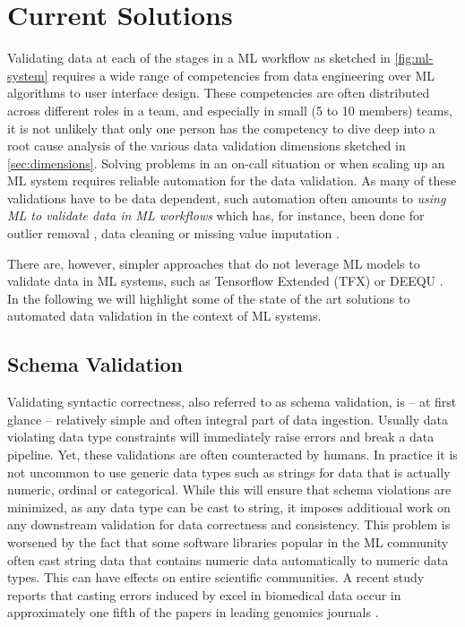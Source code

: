 \section{Current Solutions}
\label{sec:solutions}

Validating data at each of the stages in a ML workflow as sketched in \autoref{fig:ml-system} requires a wide range of competencies from data engineering over ML algorithms to user interface design. These competencies are often distributed across different roles in a team, and especially in small (5 to 10 members) teams, it is not unlikely that only one person has the competency to dive deep into a root cause analysis of the various data validation dimensions sketched in \autoref{sec:dimensions}. Solving problems in an on-call situation or when scaling up an ML system requires reliable automation for the data validation. As many of these validations have to be data dependent, such automation often amounts to {\em using ML to validate data in ML workflows} which has, for instance, been done for outlier removal \cite{Zhao2019}, data cleaning \cite{Krishnan2019} or missing value imputation \cite{Biessmann2018a}. 

\newpage
There are, however, simpler approaches that do not leverage ML models to validate data in ML systems, such as Tensorflow Extended (TFX) \cite{Baylor2017} or DEEQU \cite{Schelter2018}. In the following we will highlight some of the state of the art solutions to automated data validation in the context of ML systems.


\subsection{Schema Validation}

Validating syntactic correctness, also referred to as schema validation, is -- at first glance -- relatively simple and often integral part of data ingestion. Usually data violating data type constraints will immediately raise errors and break a data pipeline. Yet, these validations are often counteracted by humans. In practice it is not uncommon to use generic data types such as strings for data that is actually numeric, ordinal or categorical. While this will ensure that schema violations are minimized, as any data type can be cast to string, it imposes additional work on any downstream validation for data correctness and consistency. This problem is worsened by the fact that some software libraries popular in the ML community often cast string data that contains numeric data automatically to numeric data types. This can have effects on entire scientific communities. A recent study reports that casting errors induced by excel in biomedical data occur in approximately one fifth of the papers in leading genomics journals \cite{Ziemann2016}.


